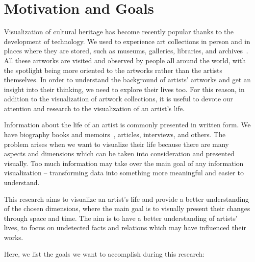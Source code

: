 \section{Motivation and Goals}\label{sec:motivation-goals}
Visualization of cultural heritage has become recently popular thanks to the development of technology. We used to experience art collections
in person and in places where they are stored, such as museums, galleries, libraries, and archives~\citep{windhager2018visualization}. All
these artworks are visited and observed by people all around the world, with the spotlight being more oriented to the artworks rather than the artists
themselves. In order to understand the background of artists’ artworks and get an insight into their thinking, we need to explore their lives
too. For this reason, in addition to the visualization of artwork collections, it is useful to devote our attention and research to the
visualization of an artist’s life.

Information about the life of an artist is commonly presented in written form. We have biography books and memoirs~\citep{herrera1983frida,
    isaacson2017leonardo, tomkins1999duchamp}, articles, interviews, and others. The problem arises when we want to visualize their life
because there are many aspects and dimensions which can be taken into consideration and presented visually. Too much information may take over
the main goal of any information visualization -- transforming data into something more meaningful and easier to understand.

This research aims to visualize an artist’s life and provide a better understanding of the chosen dimensions, where the main goal is to
visually present their changes through space and time. The aim is to have a better understanding of artists' lives, to focus on undetected facts
and relations which may have influenced their works.

Here, we list the goals we want to accomplish during this research:

